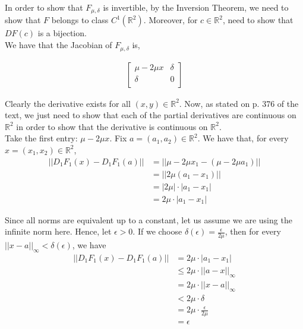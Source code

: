 \documentclass[12pt]{article}
\newenvironment{problem}[2][Problem]{\begin{trivlist}
\item[\hskip \labelsep {\bfseries #1}\hskip \labelsep {\bfseries #2.}]}{\end{trivlist}}
\begin{document}
\begin{problem}{2}
\end{problem}

In order to show that $F_{\mu, \delta}$ is invertible, by the Inversion Theorem, we need to show that $F$ belongs to class $C^1(\mathbb{R}^2)$. Moreover, for $c \in \mathbb{R}^2$, need to show that $DF(c)$ is a bijection.\\

We have that the Jacobian of $F_{\mu, \delta}$ is,

\begin{align*}
\begin{bmatrix} 
\mu - 2\mu x & \delta\\
\delta & 0\\
\end{bmatrix}
\end{align*}

Clearly the derivative exists for all $(x, y) \in \mathbb{R}^2$. Now, as stated on p. 376 of the text, we just need to show that each of the partial derivatives are continuous on $\mathbb{R}^2$ in order to show that the derivative is continuous on $\mathbb{R}^2$.\\

Take the first entry: $\mu - 2\mu x$. Fix $a = (a_1, a_2) \in \mathbb{R}^2$. We have that, for every $x = (x_1, x_2) \in \mathbb{R}^2$,
\begin{align*}
||D_1F_1(x) - D_1F_1(a)|| &= || \mu - 2\mu x_1 - (\mu - 2 \mu a_1)||\\
&= || 2\mu (a_1 - x_1) ||\\
&= |2 \mu| \cdot |a_1 - x_1|\\
&= 2\mu \cdot |a_1 - x_1|
\end{align*}

Since all norms are equivalent up to a constant, let us assume we are using the infinite norm here. Hence, let $\epsilon > 0$. If we choose $\delta(\epsilon) = \frac{\epsilon}{2\mu}$, then for every $||x - a||_{\infty} < \delta(\epsilon)$, we have
\begin{align*}
||D_1F_1(x) - D_1F_1(a)|| &= 2\mu \cdot |a_1 - x_1|\\
&\leq 2\mu \cdot ||a - x||_{\infty}\\
&= 2\mu \cdot ||x - a||_{\infty}\\
&< 2\mu \cdot \delta\\
&= 2\mu \cdot \frac{\epsilon}{2\mu}\\
&= \epsilon
\end{align*}
\end{document}
